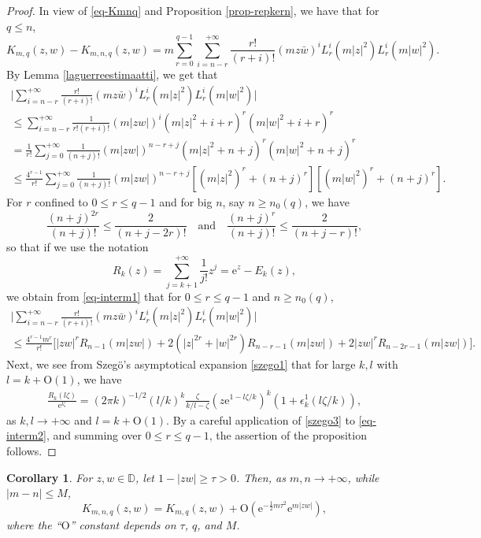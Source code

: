 \documentclass{birkart}
\newtheorem{cor}[thm]{Corollary}
\theoremstyle{definition}
\theoremstyle{remark}
\numberwithin{equation}{section}
\numberwithin{figure}{section}
\newcommand{\e}{\mathrm e}
\newcommand{\1}{{\mathbf 1}}
\newcommand{\Rpar}{q}
\newcommand{\D}{{\mathbb D}}
\newcommand{\Ordo}{\mathrm{O}}
\begin{document}
\begin{proof}
In view of \eqref{eq-Kmnq} and Proposition \ref{prop-repkern}, we have that
for $\Rpar\le n$,
\[
K_{m,\Rpar}(z,w)-K_{m,n,\Rpar}(z,w)=m\sum_{r=0}^{\Rpar-1}\sum_{i=n-r}^{+\infty}
\frac{r!}{(r+i)!}(mz \bar{w})^i L_r^{i}(m|z|^2)L_r^{i}(m|w|^2). 
\]
By Lemma \ref{laguerreestimaatti}, we get that
\begin{multline}
\label{eq-interm1}
\bigg| \sum^{+\infty}_{i=n-r} 
\frac{r!}{(r+i)!}(mz \bar{w})^i L_r^{i}(m|z|^2)L_r^{i}(m|w|^2)\bigg| 
\\
\le \sum^{+\infty}_{i=n-r}\frac{1}{r!(r+i)!}(m|zw|)^i(m|z|^2+i+r)^r
(m|w|^2+i+r)^r 
\\  
=\frac1{r!}\sum^{+\infty}_{j=0}\frac{1}{(n+j)!}(m|zw|)^{n-r+j}
(m|z|^2+n+j)^r(m|w|^2+n+j)^r
\\
\le 
\frac{4^{r-1}}{r!}\sum^{+\infty}_{j=0}\frac{1}{(n+j)!}(m|zw|)^{n-r+j}
[(m|z|^2)^r+(n+j)^r][(m|w|^2)^r+(n+j)^r].
\end{multline}
For $r$ confined to $0\le r\le\Rpar-1$ and for big $n$, say $n\ge n_0(\Rpar)$,
we have
\[
\frac{(n+j)^{2r}}{(n+j)!}\le \frac{2}{(n+j-2r)!}\quad\text{and}\quad
\frac{(n+j)^{r}}{(n+j)!}\le \frac{2}{(n+j-r)!},
\]
so that if we use the notation 
\[
R_k(z)=\sum_{j=k+1}^{+\infty}\frac1{j!}z^j=\e^z-E_k(z),
\]
we obtain from \eqref{eq-interm1} that for $0\le r\le\Rpar-1$ and
$n\ge n_0(\Rpar)$,
\begin{multline}
\label{eq-interm2}
\bigg| \sum^{+\infty}_{i=n-r} 
\frac{r!}{(r+i)!}(mz \bar{w})^i L_r^{i}(m|z|^2)L_r^{i}(m|w|^2)\bigg| 
\\
\le
\frac{4^{r-1}m^r}{r!}\Big[
|zw|^r R_{n-1}(m|zw|)+
2(|z|^{2r}+|w|^{2r}) R_{n-r-1}(m|zw|)
+2|zw|^r R_{n-2r-1}(m|zw|)\Big].
\end{multline}
Next, we see from Szeg\"o's asymptotical expansion \eqref{szego1} that
for large $k,l$ with $l=k+\Ordo(1)$, we have
\begin{align} 
\label{szego3}
\frac{R_k(l\zeta)}{\e^{l\zeta}}= (2 \pi k)^{-1/2}(l/k)^{k}
\frac{\zeta}{k/l-\zeta}(z\e^{1-l\zeta/k})^k(1+\epsilon^{1}_k(l\zeta/k)),
\end{align}
as $k,l\to+\infty$ and $l=k+\Ordo(1)$. 
By a careful application of \eqref{szego3} to \eqref{eq-interm2}, and summing
over $0\le r\le \Rpar-1$, the assertion of the proposition follows. 
\end{proof}

\begin{cor} 
\label{cor-kapprox}
For $z,w\in\D$, let $1-|zw|\ge\tau>0$. Then, as 
$m,n\to+\infty$, while $|m-n|\le M$,
\begin{equation*} 
K_{m,n,\Rpar}(z,w)=K_{m,\Rpar}(z,w)+\Ordo(\e^{-\frac12m\tau^2}
\e^{m|zw|}), 
\end{equation*}
where the ``$\Ordo$'' constant depends on $\tau$, $\Rpar$, and $M$. 
\end{cor}
\end{document}
